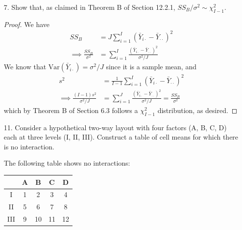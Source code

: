 \documentclass{article}
\newcommand{\var}{\mathrm{Var}}
\begin{document}
\begin{itemize}
\begin{proof}
			The $F$ test statistic in the case $I=2$ is
			\[F=\frac{SS_B/(I-1)}{SS_W/[I(J-1)]} = \frac{SS_B}{SS_W/[2(J-1)]}\]
			Here, the grand mean is given by $\frac{\bar X+\bar Y}{2}.$ Thus, we have
			\begin{align*}
				SS_B &= J\left[\left( \bar X- \frac{\bar X + \bar Y}{2}\right)^2 + \left( \bar Y-\frac{\bar X+\bar Y}{2} \right)^2\right] \\
				&= 2J\left( \frac{\bar X - \bar Y}{2} \right)^2 = \frac{J}{2}(\bar X-\bar Y)^2
			\end{align*}
			Then
			\begin{align*}
				\frac{SS_W}{2(J-1)} &= \frac{1}{2(J-1)}\left(\sum_{i=1}^{J}(X_i-\bar X)^2 + \sum_{i=1}^{J} (Y_i-\bar Y)^2 \right) = s_p^2
			\end{align*}
			so the $F$ test is given by
			\[F=\frac{J}{2\sigma_p^2}(\bar X-\bar Y)^2\]
			and the null hypothesis is rejected if $F$ is large. If $F$ is large, then $\exp(-F/2)$ is small, which is the same condition for rejecting the null hypothesis using the likelihood ratio.
		\end{proof}

	\item[7.] Show that, as claimed in Theorem B of Section 12.2.1, $SS_B/\sigma^2\sim\chi_{I-1}^2.$
		\begin{proof}
			We have
			\begin{align*}
				SS_B&=J\sum_{i=1}^{I}(\bar Y_{i\cdot} - \bar Y_{\cdot\cdot})^2 \\
				\implies \frac{SS_B}{\sigma^2} &= \sum_{i=1}^{I}\frac{(\bar Y_{i\cdot}-\bar Y_{\cdot\cdot})^2}{\sigma^2/J}
			\end{align*}	
			We know that $\var(\bar Y_{i\cdot}) = \sigma^2/J$ since it is a sample mean, and
			\begin{align*}
				s^2&=\frac{1}{I-1} \sum_{i=1}^{I}(\bar Y_{i\cdot}-\bar Y_{\cdot\cdot})^2 \\
				\implies \frac{(I-1)s^2}{\sigma^2/J} &= \sum_{i=1}^{J}\frac{(\bar Y_{i\cdot}-\bar Y_{\cdot\cdot})^2}{\sigma^2/J} = \frac{SS_B}{\sigma^2}
			\end{align*}
			which by Theorem B of Section 6.3 follows a $\chi_{I-1}^2$ distribution, as desired.
		\end{proof}

	\item[11.] Consider a hypothetical two-way layout with four factors (A, B, C, D) each at three levels (I, II, III). Construct a table of cell means for which there is no interaction.
		\begin{soln}
			The following table shows no interactions:
			\begin{center}
				\begin{tabular}{c|cccc}
					& A & B & C & D \\
					\hline
					I & 1 & 2 & 3 & 4 \\
					II & 5 & 6 & 7 & 8\\
					III & 9 & 10 & 11 & 12
				\end{tabular}
			\end{center}
		\end{soln}


\end{itemize}
\end{document}
